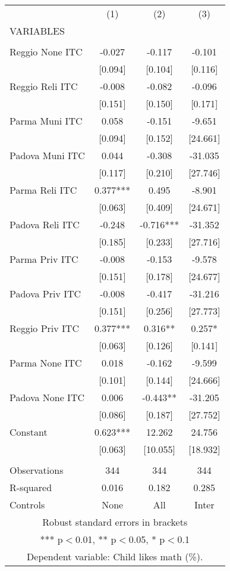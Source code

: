 \begin{tabular}{lccc} \hline
 & (1) & (2) & (3) \\
VARIABLES &  &  &  \\ \hline
 &  &  &  \\
Reggio None ITC & -0.027 & -0.117 & -0.101 \\
 & [0.094] & [0.104] & [0.116] \\
Reggio Reli ITC & -0.008 & -0.082 & -0.096 \\
 & [0.151] & [0.150] & [0.171] \\
Parma Muni ITC & 0.058 & -0.151 & -9.651 \\
 & [0.094] & [0.152] & [24.661] \\
Padova Muni ITC & 0.044 & -0.308 & -31.035 \\
 & [0.117] & [0.210] & [27.746] \\
Parma Reli ITC & 0.377*** & 0.495 & -8.901 \\
 & [0.063] & [0.409] & [24.671] \\
Padova Reli ITC & -0.248 & -0.716*** & -31.352 \\
 & [0.185] & [0.233] & [27.716] \\
Parma Priv ITC & -0.008 & -0.153 & -9.578 \\
 & [0.151] & [0.178] & [24.677] \\
Padova Priv ITC & -0.008 & -0.417 & -31.216 \\
 & [0.151] & [0.256] & [27.773] \\
Reggio Priv ITC & 0.377*** & 0.316** & 0.257* \\
 & [0.063] & [0.126] & [0.141] \\
Parma None ITC & 0.018 & -0.162 & -9.599 \\
 & [0.101] & [0.144] & [24.666] \\
Padova None ITC & 0.006 & -0.443** & -31.205 \\
 & [0.086] & [0.187] & [27.752] \\
Constant & 0.623*** & 12.262 & 24.756 \\
 & [0.063] & [10.055] & [18.932] \\
 &  &  &  \\
Observations & 344 & 344 & 344 \\
R-squared & 0.016 & 0.182 & 0.285 \\
 Controls & None & All & Inter \\ \hline
\multicolumn{4}{c}{ Robust standard errors in brackets} \\
\multicolumn{4}{c}{ *** p$<$0.01, ** p$<$0.05, * p$<$0.1} \\
\multicolumn{4}{c}{ Dependent variable: Child likes math (\%).} \\
\end{tabular}
